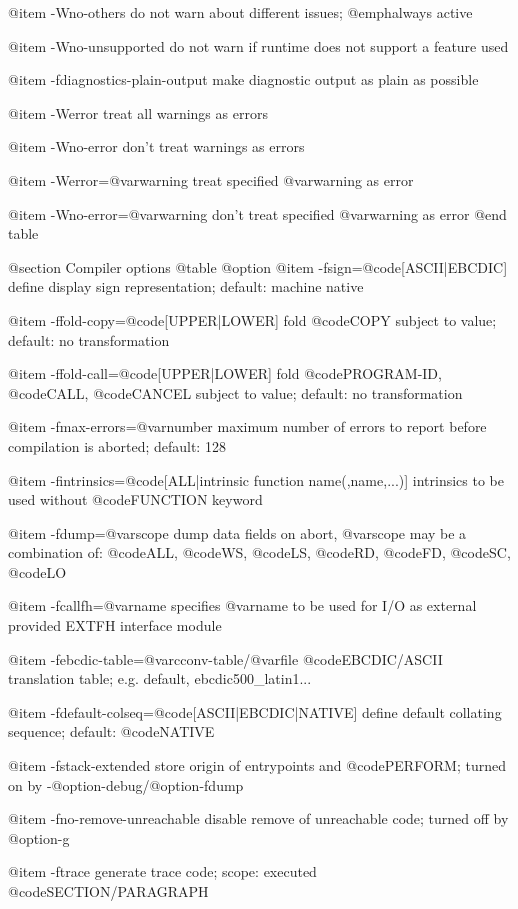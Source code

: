 @item -Wno-others
do not warn about different issues; @emph{always} active

@item -Wno-unsupported
do not warn if runtime does not support a feature used

@item -fdiagnostics-plain-output
make diagnostic output as plain as possible

@item -Werror
treat all warnings as errors

@item -Wno-error
don't treat warnings as errors

@item -Werror=@var{warning}
treat specified @var{warning} as error

@item -Wno-error=@var{warning}
don't treat specified @var{warning} as error
@end table

@section Compiler options
@table @option
@item -fsign=@code{[ASCII|EBCDIC]}
define display sign representation; default: machine native

@item -ffold-copy=@code{[UPPER|LOWER]}
fold @code{COPY} subject to value; default: no transformation

@item -ffold-call=@code{[UPPER|LOWER]}
fold @code{PROGRAM-ID}, @code{CALL}, @code{CANCEL} subject to value; default: no transformation

@item -fmax-errors=@var{number}
maximum number of errors to report before
compilation is aborted; default: 128

@item -fintrinsics=@code{[ALL}|intrinsic function name(,name,...)]
intrinsics to be used without @code{FUNCTION} keyword

@item -fdump=@var{scope}
dump data fields on abort, @var{scope} may be
a combination of: @code{ALL}, @code{WS}, @code{LS}, @code{RD}, @code{FD}, @code{SC}, @code{LO}

@item -fcallfh=@var{name}
specifies @var{name} to be used for I/O
as external provided EXTFH interface module

@item -febcdic-table=@var{cconv-table}/@var{file}
@code{EBCDIC/ASCII} translation table; e.g. default, ebcdic500_latin1...

@item -fdefault-colseq=@code{[ASCII|EBCDIC|NATIVE]}
define default collating sequence; default: @code{NATIVE}

@item -fstack-extended
store origin of entrypoints and @code{PERFORM}; turned on by -@option{-debug}/@option{-fdump}

@item -fno-remove-unreachable
disable remove of unreachable code; turned off by @option{-g}

@item -ftrace
generate trace code; scope: executed @code{SECTION/PARAGRAPH}

